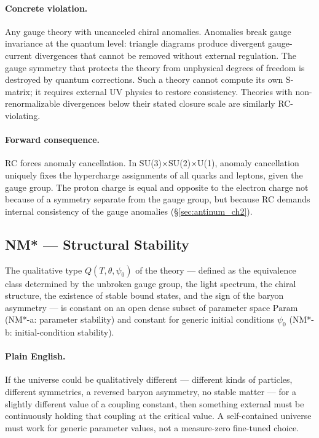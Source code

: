 \documentclass[11pt,openany]{book}
\theoremstyle{remark}
\begin{document}
\paragraph{Concrete violation.}
Any gauge theory with uncanceled chiral anomalies. Anomalies break gauge invariance
at the quantum level: triangle diagrams produce divergent gauge-current divergences
that cannot be removed without external regulation. The gauge symmetry that protects
the theory from unphysical degrees of freedom is destroyed by quantum corrections.
Such a theory cannot compute its own S-matrix; it requires external UV physics to
restore consistency. Theories with non-renormalizable divergences below their stated
closure scale are similarly RC-violating.

\paragraph{Forward consequence.}
RC forces anomaly cancellation. In SU(3)$\times$SU(2)$\times$U(1), anomaly
cancellation uniquely fixes the hypercharge assignments of all quarks and leptons,
given the gauge group. The proton charge is equal and opposite to the electron charge
not because of a symmetry separate from the gauge group, but because RC demands
internal consistency of the gauge anomalies (§\ref{sec:antinum_ch2}).

\subsection*{NM* --- Structural Stability}

\begin{tcolorbox}[colback=green!5,colframe=green!50!black,
  title={Definition: NM* --- Structural Stability}]
The qualitative type $Q(T, \theta, \psi_0)$ of the theory --- defined as the
equivalence class determined by the unbroken gauge group, the light spectrum, the
chiral structure, the existence of stable bound states, and the sign of the baryon
asymmetry --- is constant on an open dense subset of parameter space $\mathrm{Param}$
(NM*-a: parameter stability) and constant for generic initial conditions $\psi_0$
(NM*-b: initial-condition stability).
\end{tcolorbox}

\paragraph{Plain English.}
If the universe could be qualitatively different --- different kinds of particles,
different symmetries, a reversed baryon asymmetry, no stable matter --- for a
slightly different value of a coupling constant, then something external must be
continuously holding that coupling at the critical value. A self-contained universe
must work for generic parameter values, not a measure-zero fine-tuned choice.
\end{document}
